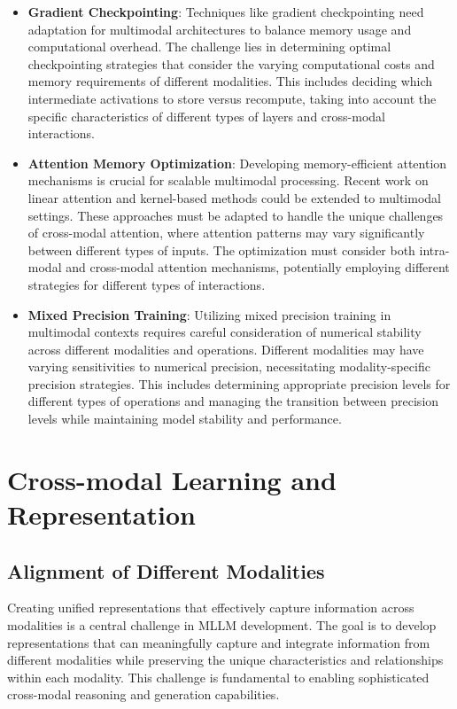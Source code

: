 \begin{itemize}
    \item \textbf{Gradient Checkpointing}: Techniques like gradient checkpointing \citep{chen2016training} need adaptation for multimodal architectures to balance memory usage and computational overhead. The challenge lies in determining optimal checkpointing strategies that consider the varying computational costs and memory requirements of different modalities. This includes deciding which intermediate activations to store versus recompute, taking into account the specific characteristics of different types of layers and cross-modal interactions.
    
    \item \textbf{Attention Memory Optimization}: Developing memory-efficient attention mechanisms is crucial for scalable multimodal processing. Recent work on linear attention \citep{katharopoulos2020transformers} and kernel-based methods \citep{choromanski2021rethinking} could be extended to multimodal settings. These approaches must be adapted to handle the unique challenges of cross-modal attention, where attention patterns may vary significantly between different types of inputs. The optimization must consider both intra-modal and cross-modal attention mechanisms, potentially employing different strategies for different types of interactions.
    
    \item \textbf{Mixed Precision Training}: Utilizing mixed precision training \citep{micikevicius2018mixed} in multimodal contexts requires careful consideration of numerical stability across different modalities and operations. Different modalities may have varying sensitivities to numerical precision, necessitating modality-specific precision strategies. This includes determining appropriate precision levels for different types of operations and managing the transition between precision levels while maintaining model stability and performance.
\end{itemize}

\section{Cross-modal Learning and Representation}

\subsection{Alignment of Different Modalities}
Creating unified representations that effectively capture information across modalities is a central challenge in MLLM development. The goal is to develop representations that can meaningfully capture and integrate information from different modalities while preserving the unique characteristics and relationships within each modality. This challenge is fundamental to enabling sophisticated cross-modal reasoning and generation capabilities.

